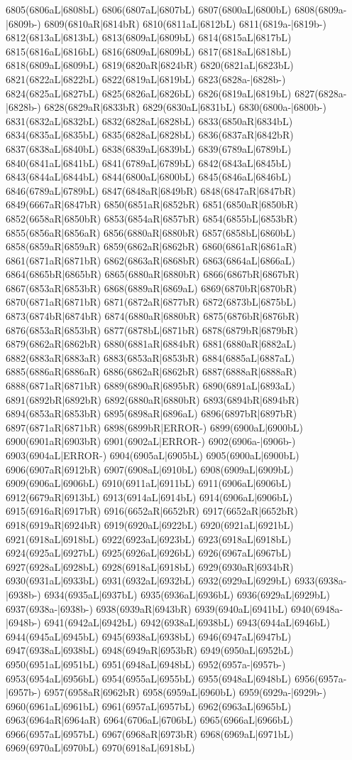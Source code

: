 6805(6806aL|6808bL) 6806(6807aL|6807bL) 6807(6800aL|6800bL) 6808(6809a-|6809b-) 6809(6810aR|6814bR) 6810(6811aL|6812bL) 6811(6819a-|6819b-) 6812(6813aL|6813bL) 6813(6809aL|6809bL) 6814(6815aL|6817bL) 6815(6816aL|6816bL) 6816(6809aL|6809bL) 6817(6818aL|6818bL) 6818(6809aL|6809bL) 6819(6820aR|6824bR) 6820(6821aL|6823bL) 6821(6822aL|6822bL) 6822(6819aL|6819bL) 6823(6828a-|6828b-) 6824(6825aL|6827bL) 6825(6826aL|6826bL) 6826(6819aL|6819bL) 6827(6828a-|6828b-) 6828(6829aR|6833bR) 6829(6830aL|6831bL) 6830(6800a-|6800b-) 6831(6832aL|6832bL) 6832(6828aL|6828bL) 6833(6850aR|6834bL) 6834(6835aL|6835bL) 6835(6828aL|6828bL) 6836(6837aR|6842bR) 6837(6838aL|6840bL) 6838(6839aL|6839bL) 6839(6789aL|6789bL) 6840(6841aL|6841bL) 6841(6789aL|6789bL) 6842(6843aL|6845bL) 6843(6844aL|6844bL) 6844(6800aL|6800bL) 6845(6846aL|6846bL) 6846(6789aL|6789bL) 6847(6848aR|6849bR) 6848(6847aR|6847bR) 6849(6667aR|6847bR) 6850(6851aR|6852bR) 6851(6850aR|6850bR) 6852(6658aR|6850bR) 6853(6854aR|6857bR) 6854(6855bL|6853bR) 6855(6856aR|6856aR) 6856(6880aR|6880bR) 6857(6858bL|6860bL) 6858(6859aR|6859aR) 6859(6862aR|6862bR) 6860(6861aR|6861aR) 6861(6871aR|6871bR) 6862(6863aR|6868bR) 6863(6864aL|6866aL) 6864(6865bR|6865bR) 6865(6880aR|6880bR) 6866(6867bR|6867bR) 6867(6853aR|6853bR) 6868(6889aR|6869aL) 6869(6870bR|6870bR) 6870(6871aR|6871bR) 6871(6872aR|6877bR) 6872(6873bL|6875bL) 6873(6874bR|6874bR) 6874(6880aR|6880bR) 6875(6876bR|6876bR) 6876(6853aR|6853bR) 6877(6878bL|6871bR) 6878(6879bR|6879bR) 6879(6862aR|6862bR) 6880(6881aR|6884bR) 6881(6880aR|6882aL) 6882(6883aR|6883aR) 6883(6853aR|6853bR) 6884(6885aL|6887aL) 6885(6886aR|6886aR) 6886(6862aR|6862bR) 6887(6888aR|6888aR) 6888(6871aR|6871bR) 6889(6890aR|6895bR) 6890(6891aL|6893aL) 6891(6892bR|6892bR) 6892(6880aR|6880bR) 6893(6894bR|6894bR) 6894(6853aR|6853bR) 6895(6898aR|6896aL) 6896(6897bR|6897bR) 6897(6871aR|6871bR) 6898(6899bR|ERROR-) 6899(6900aL|6900bL) 6900(6901aR|6903bR) 6901(6902aL|ERROR-) 6902(6906a-|6906b-) 6903(6904aL|ERROR-) 6904(6905aL|6905bL) 6905(6900aL|6900bL) 6906(6907aR|6912bR) 6907(6908aL|6910bL) 6908(6909aL|6909bL) 6909(6906aL|6906bL) 6910(6911aL|6911bL) 6911(6906aL|6906bL) 6912(6679aR|6913bL) 6913(6914aL|6914bL) 6914(6906aL|6906bL) 6915(6916aR|6917bR) 6916(6652aR|6652bR) 6917(6652aR|6652bR) 6918(6919aR|6924bR) 6919(6920aL|6922bL) 6920(6921aL|6921bL) 6921(6918aL|6918bL) 6922(6923aL|6923bL) 6923(6918aL|6918bL) 6924(6925aL|6927bL) 6925(6926aL|6926bL) 6926(6967aL|6967bL) 6927(6928aL|6928bL) 6928(6918aL|6918bL) 6929(6930aR|6934bR) 6930(6931aL|6933bL) 6931(6932aL|6932bL) 6932(6929aL|6929bL) 6933(6938a-|6938b-) 6934(6935aL|6937bL) 6935(6936aL|6936bL) 6936(6929aL|6929bL) 6937(6938a-|6938b-) 6938(6939aR|6943bR) 6939(6940aL|6941bL) 6940(6948a-|6948b-) 6941(6942aL|6942bL) 6942(6938aL|6938bL) 6943(6944aL|6946bL) 6944(6945aL|6945bL) 6945(6938aL|6938bL) 6946(6947aL|6947bL) 6947(6938aL|6938bL) 6948(6949aR|6953bR) 6949(6950aL|6952bL) 6950(6951aL|6951bL) 6951(6948aL|6948bL) 6952(6957a-|6957b-) 6953(6954aL|6956bL) 6954(6955aL|6955bL) 6955(6948aL|6948bL) 6956(6957a-|6957b-) 6957(6958aR|6962bR) 6958(6959aL|6960bL) 6959(6929a-|6929b-) 6960(6961aL|6961bL) 6961(6957aL|6957bL) 6962(6963aL|6965bL) 6963(6964aR|6964aR) 6964(6706aL|6706bL) 6965(6966aL|6966bL) 6966(6957aL|6957bL) 6967(6968aR|6973bR) 6968(6969aL|6971bL) 6969(6970aL|6970bL) 6970(6918aL|6918bL) 